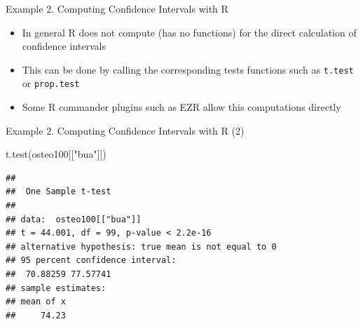 \documentclass[
  ignorenonframetext,
]{beamer}
\newenvironment{Shaded}{\begin{snugshade}}{\end{snugshade}}
\newcommand{\FunctionTok}[1]{\textcolor[rgb]{0.00,0.00,0.00}{#1}}
\newcommand{\NormalTok}[1]{#1}
\newcommand{\StringTok}[1]{\textcolor[rgb]{0.31,0.60,0.02}{#1}}
\begin{document}
\begin{frame}[fragile]{Example 2. Computing Confidence Intervals with R}
\protect\hypertarget{example-2.-computing-confidence-intervals-with-r}{}
\begin{itemize}
\item
  In general R does not compute (has no functions) for the direct
  calculation of confidence intervals
\item
  This can be done by calling the corresponding tests functions such as
  \texttt{t.test} or \texttt{prop.test}
\item
  Some R commander plugins such as EZR allow this computations directly
\end{itemize}
\end{frame}

\begin{frame}[fragile]
\begin{block}{Example 2. Computing Confidence Intervals with R (2)}
\protect\hypertarget{example-2.-computing-confidence-intervals-with-r-2}{}
\begin{Shaded}
\begin{Highlighting}[]
\FunctionTok{t.test}\NormalTok{(osteo100[[}\StringTok{"bua"}\NormalTok{]])}
\end{Highlighting}
\end{Shaded}

\begin{verbatim}
## 
##  One Sample t-test
## 
## data:  osteo100[["bua"]]
## t = 44.001, df = 99, p-value < 2.2e-16
## alternative hypothesis: true mean is not equal to 0
## 95 percent confidence interval:
##  70.88259 77.57741
## sample estimates:
## mean of x 
##     74.23
\end{verbatim}
\end{block}
\end{frame}
\end{document}
